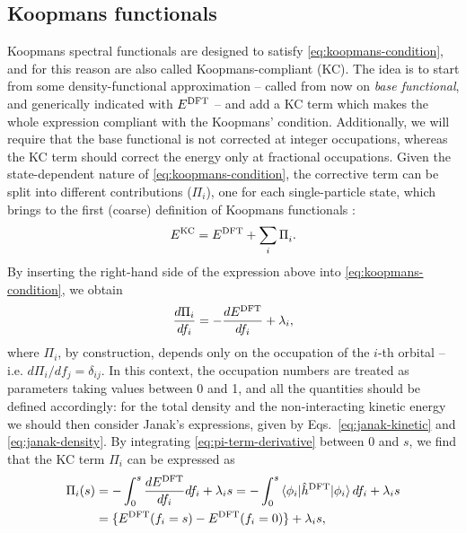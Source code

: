 \subsection{Koopmans functionals\label{sec:koopmans-functionals}}
Koopmans spectral functionals are designed to satisfy \cref{eq:koopmans-condition}, and for this reason are also called Koopmans-compliant (KC). The idea is to start from some density-functional approximation -- called from now on \emph{base functional}, and generically indicated with $E^{\rm DFT}$ -- and add a KC term which makes the whole expression compliant with the Koopmans' condition. Additionally, we will require that the base functional is not corrected at integer occupations, whereas the KC term should correct the energy only at fractional occupations. Given the state-dependent nature of \cref{eq:koopmans-condition}, the corrective term can be split into different contributions ($\Pi_i$), one for each single-particle state, which brings to the first (coarse) definition of Koopmans functionals  \cite{dabo_non-koopmans_2009,dabo_koopmans_2010}:
%
\begin{equation}
    E^{\rm KC} = E^{\rm DFT} + \sum_i \Pi_i^{\rm} .
    \label{eq:kc-functional-coarse}
\end{equation}
%
By inserting the right-hand side of the expression above into \cref{eq:koopmans-condition}, we obtain
%
\begin{equation}
    \frac{d\Pi_i}{df_i} = - \frac{dE^{\rm DFT}}{df_i} + \lambda_i ,
    \label{eq:pi-term-derivative}
\end{equation}
%
where $\Pi_i$, by construction, depends only on the occupation of the $i$-th orbital -- i.e. $d\Pi_i / df_j = \delta_{ij}$. In this context, the occupation numbers are treated as parameters taking values between 0 and 1, and all the quantities should be defined accordingly: for the total density and the non-interacting kinetic energy we should then consider Janak's expressions, given by Eqs.~\eqref{eq:janak-kinetic} and \eqref{eq:janak-density}. By integrating \cref{eq:pi-term-derivative} between 0 and $s$, we find that the KC term $\Pi_i$ can be expressed as
%
\begin{equation}
    \begin{split}
    \Pi_i(s) &= - \int_0^{s} \frac{dE^{\rm DFT}}{df_i} df_i + \lambda_i s =
    - \int_0^{s} \braket{\phi_i|\hat{h}^{\rm DFT}|\phi_i} df_i + \lambda_i s \\
    &= \{ E^{\rm DFT}(f_i=s) - E^{\rm DFT}(f_i=0) \} + \lambda_i s ,
    \end{split}
    \label{eq:pi-term-general}
\end{equation}
